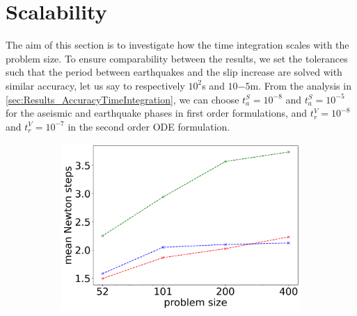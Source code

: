 \section{Scalability}
\label{sec:Results_Scalability}
The aim of this section is to investigate how the time integration scales with the problem size. To ensure comparability between the results, we set the tolerances such that the period between earthquakes and the slip increase are solved with similar accuracy, let us say to respectively $10^2$s and $10{-5}$m. From the analysis in \autoref{sec:Results_AccuracyTimeIntegration}, we can choose $t_a^S=10^{-8}$ and $t_a^S=10^{-5}$ for the aseismic and earthquake phases in first order formulations, and $t_r^V=10^{-8}$ and $t_r^V=10^{-7}$ in the second order ODE formulation. 

\begin{figure}[H]
	\centering
	\begin{subfigure}[b]{0.32\textwidth}
		\centering
		\includegraphics[width=1\textwidth]{images/TANDEM_averageNumberNewtonSteps.png}
	\end{subfigure} 
	\begin{subfigure}[b]{0.32\textwidth}
		\centering

\end{subfigure}
\end{figure}
